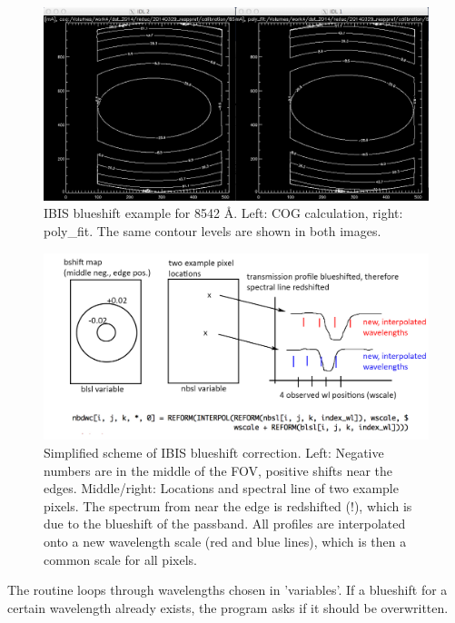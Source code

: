 \documentclass[a4paper,11pt]{article}
\begin{document}
\begin{figure}[!htb]
\begin{centering}
\includegraphics[width=.9\textwidth]{ibisblueshift.png}
\caption{IBIS blueshift example for 8542 \AA. Left: COG calculation, right: poly\_fit. The same contour levels are shown in both images.\label{figbs}}
\end{centering}
\end{figure}

 \begin{figure}[!htb]
\begin{centering}
\includegraphics[width=.9\textwidth]{ibis_blueshift_scheme.jpg}
\caption{Simplified scheme of IBIS blueshift correction. Left: Negative numbers are in the middle of the FOV, positive shifts near the edges. Middle/right: Locations and spectral line of two example pixels. The spectrum from near the edge is redshifted (!), which is due to the blueshift of the passband. All profiles are interpolated onto a new wavelength scale (red and blue lines), which is then a common scale for all pixels.\label{figbs2}}
\end{centering}
\end{figure}


The routine loops through wavelengths chosen in 'variables'. If a blueshift for a certain wavelength already exists, the program asks if it should be overwritten.
\end{document}
